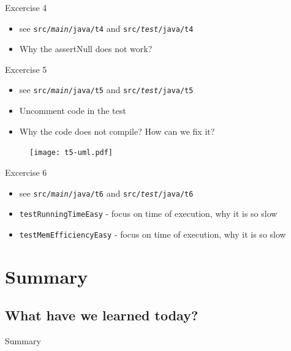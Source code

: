 \documentclass{beamer}
\begin{document}
\begin{frame}{Excercise 4}

\begin{itemize}
    \item see \texttt{src/\textit{main}/java/t4} and \texttt{src/\textit{test}/java/t4}
    \item Why the assertNull does not work?
\end{itemize}
\end{frame}

\begin{frame}{Excercise 5}

\begin{itemize}
    \item see \texttt{src/\textit{main}/java/t5} and \texttt{src/\textit{test}/java/t5}
    \item Uncomment code in the test
    \item Why the code does not compile? How can we fix it?
\end{itemize}
    \begin{figure}[htbp]
    \centering
        \texttt{[image: t5-uml.pdf]}
    \label{fig:t5-uml}
    \end{figure}
\end{frame}

\begin{frame}{Excercise 6}

\begin{itemize}
    \item see \texttt{src/\textit{main}/java/t6} and \texttt{src/\textit{test}/java/t6}
    \item \texttt{testRunningTimeEasy} - focus on time of execution, why it is so slow
    \item \texttt{testMemEfficiencyEasy} - focus on time of execution, why it is so slow
\end{itemize}
\end{frame}

\section{Summary}
\subsection{What have we learned today?}

\begin{frame}[c]{ }
    \centering
    Summary
\end{frame}
\end{document}
